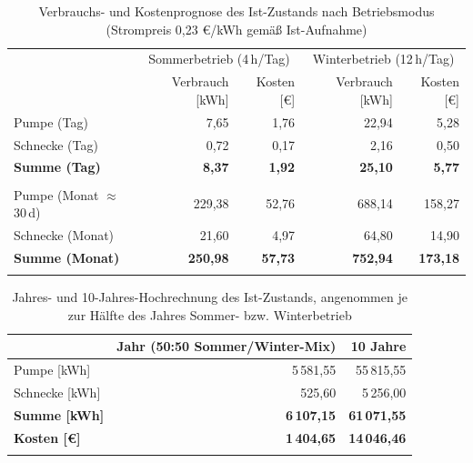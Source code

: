 \begin{table}[h]
    \centering
    \small
    \begin{tabular}{lrrrr}
        \hline
        & \multicolumn{2}{c}{Sommerbetrieb (4\,h/Tag)} & \multicolumn{2}{c}{Winterbetrieb (12\,h/Tag)} \\
        & Verbrauch [kWh] & Kosten [€] & Verbrauch [kWh] & Kosten [€] \\
        \hline
        Pumpe (Tag)        & 7,65 & 1,76    & 22,94  & 5,28     \\
        Schnecke (Tag)     & 0,72 & 0,17    & 2,16 & 0,50     \\
        \textbf{Summe (Tag)}   & \textbf{8,37} & \textbf{1,92} & \textbf{25,10} & \textbf{5,77} \\
        \hline
        \\
        Pumpe (Monat $\approx$ 30\,d)     & 229,38  & 52,76    & 688,14 & 158,27      \\
        Schnecke (Monat)   & 21,60 & 4,97    & 64,80 & 14,90      \\
        \textbf{Summe (Monat)} & \textbf{250,98} & \textbf{57,73} & \textbf{752,94} & \textbf{173,18} \\
        \hline
        \\
    \end{tabular}
    \caption{Verbrauchs- und Kostenprognose des Ist-Zustands nach Betriebsmodus (Strompreis 0,23 €/kWh gemäß Ist-Aufnahme)}
    \label{tab:VerbrauchIstZustand}
\end{table}

\begin{table}[H]
    \centering
    \begin{tabular}{lrr}
        \hline
        & Jahr (50:50 Sommer/Winter-Mix) & 10 Jahre \\
        \hline
        Pumpe [kWh]         & 5\,581,55 & 55\,815,55 \\
        Schnecke [kWh]      & 525,60 & 5\,256,00 \\
        \textbf{Summe [kWh]}    & \textbf{6\,107,15} & \textbf{61\,071,55} \\
        \textbf{Kosten [€]}     & \textbf{1\,404,65} & \textbf{14\,046,46} \\
        \hline
        \\
    \end{tabular}
    \caption{Jahres- und 10-Jahres-Hochrechnung des Ist-Zustands, angenommen je zur Hälfte des Jahres Sommer- bzw. Winterbetrieb}
    \label{tab:VerbrauchIstZustandJahr}
\end{table}

